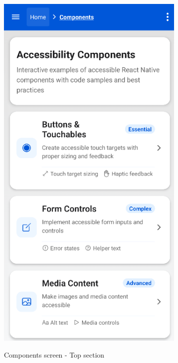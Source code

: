 \begin{figure}[ht]
\begin{subfigure}[b]{0.48\textwidth}
        \includegraphics[width=\linewidth, alt={First part of the Components screen}]{img/components1.png}
        \caption{Components screen - Top section}
        \label{fig:components-top}
    \end{subfigure}
    \hfill
    \begin{subfigure}[b]{0.48\textwidth}

\end{subfigure}
\end{figure}
